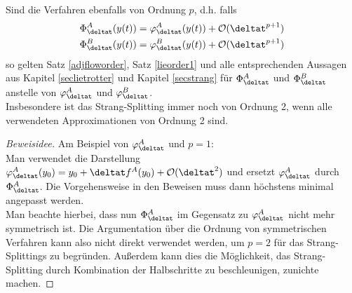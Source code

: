 \begin{maththeorem}
Sind die Verfahren ebenfalls von Ordnung $p$, d.h. falls 
\begin{align*}
\Phi_{\deltat}^A(y(t))=\varphi_{\deltat}^A(y(t))+\mathcal{O}(\deltat^{p+1})\\
\Phi_{\deltat}^B(y(t))=\varphi_{\deltat}^B(y(t))+\mathcal{O}(\deltat^{p+1})
\end{align*}
so gelten Satz \ref{adjfloworder}, Satz \ref{lieorder1} und alle entsprechenden Aussagen aus Kapitel \ref{seclietrotter} und Kapitel \ref{secstrang} für $\Phi_{\deltat}^A$ und $\Phi_{\deltat}^B$ anstelle von $\varphi_{\deltat}^A$ und $\varphi_{\deltat}^B$.\\
Insbesondere ist das Strang-Splitting immer noch von Ordnung 2, wenn alle verwendeten Approximationen von Ordnung 2 sind.
\end{maththeorem}
\begin{proof}[Beweisidee]
Am Beispiel von $\varphi_{\deltat}^A$ und $p=1$:\\
Man verwendet die Darstellung $\varphi_{\deltat}^A(y_0)=y_0+\deltat f^A(y_0)+\mathcal{O}(\deltat^2)$ und ersetzt $\varphi_{\deltat}^A$ durch $\Phi_{\deltat}^A$. Die Vorgehensweise in den Beweisen muss dann höchstens minimal angepasst werden.\\
Man beachte hierbei, dass nun $\Phi_{\deltat}^A$ im Gegensatz zu $\varphi_{\deltat}^A$ nicht mehr symmetrisch ist. Die Argumentation über die Ordnung von symmetrischen Verfahren kann also nicht direkt verwendet werden, um $p=2$ für das Strang-Splittings zu begründen. Außerdem kann dies die Möglichkeit, das Strang-Splitting durch Kombination der Halbschritte zu beschleunigen, zunichte machen.
\end{proof}

